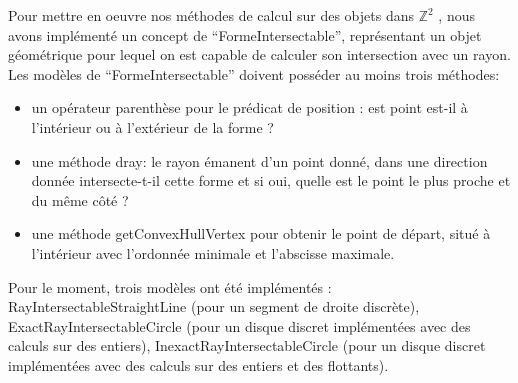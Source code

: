 
Pour mettre en oeuvre nos méthodes de calcul sur des objets dans $\mathbb{Z}^{2}$ , nous avons implémenté un concept de ``FormeIntersectable'', 
représentant un objet géométrique pour lequel on est capable de calculer son intersection avec un rayon. Les modèles de ``FormeIntersectable''
doivent posséder au moins trois méthodes: 

\begin{itemize}
  \item un opérateur parenthèse pour le prédicat de position : est point est-il à l'intérieur ou à l'extérieur de la forme ?
  \item une méthode dray: le rayon émanent d'un point donné, dans une direction donnée intersecte-t-il cette forme et si oui, quelle est le point le plus proche et du même côté ?
  \item une méthode getConvexHullVertex pour obtenir le point de départ, situé à l'intérieur avec l'ordonnée minimale et l'abscisse maximale. 
\end{itemize}

Pour le moment, trois modèles ont été implémentés : RayIntersectableStraightLine (pour un segment de droite discrète), ExactRayIntersectableCircle (pour un disque discret implémentées avec des calculs sur des entiers), InexactRayIntersectableCircle (pour un disque discret implémentées avec des calculs sur des entiers et des flottants).

